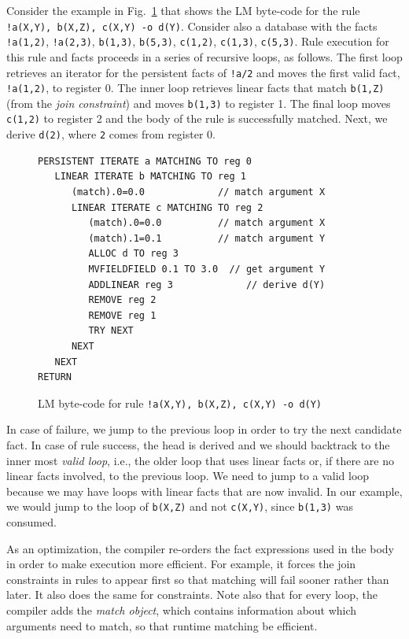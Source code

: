 Consider the example in Fig.~\ref{fig:byte_code} that shows the LM
byte-code for the rule \texttt{!a(X,Y), b(X,Z), c(X,Y) -o
d(Y)}. Consider also a database with the
facts \texttt{!a(1,2)}, \texttt{!a(2,3)}, \texttt{b(1,3)},
\texttt{b(5,3)}, \texttt{c(1,2)}, \texttt{c(1,3)}, \texttt{c(5,3)}. Rule
execution for this rule and facts proceeds in a series of recursive
loops, as follows. The first loop retrieves an iterator for the
persistent facts of \texttt{!a/2} and moves the first valid
fact, \texttt{!a(1,2)}, to register 0. The inner loop retrieves linear
facts that match \texttt{b(1,Z)} (from the
\emph{join constraint}) and moves \texttt{b(1,3)} to register 1. The 
final loop moves \texttt{c(1,2)} to register 2 and the body of the
rule is successfully matched. Next, we derive \texttt{d(2)},
where \texttt{2} comes from register 0.

\begin{figure}[ht]
{\footnotesize
\begin{Verbatim}
PERSISTENT ITERATE a MATCHING TO reg 0
   LINEAR ITERATE b MATCHING TO reg 1
      (match).0=0.0             // match argument X
      LINEAR ITERATE c MATCHING TO reg 2
         (match).0=0.0          // match argument X
         (match).1=0.1          // match argument Y
         ALLOC d TO reg 3
         MVFIELDFIELD 0.1 TO 3.0  // get argument Y
         ADDLINEAR reg 3             // derive d(Y)
         REMOVE reg 2
         REMOVE reg 1
         TRY NEXT
      NEXT
   NEXT
RETURN
\end{Verbatim}
}
\caption{LM byte-code for rule \texttt{!a(X,Y), b(X,Z), c(X,Y) -o d(Y)}}
\label{fig:byte_code}
\end{figure}

In case of failure, we jump to the previous loop in order to try the
next candidate fact. In case of rule success, the head is derived and
we should backtrack to the inner most \emph{valid loop}, i.e., the
older loop that uses linear facts or, if there are no linear facts
involved, to the previous loop. We need to jump to a valid loop
because we may have loops with linear facts that are now invalid. In
our example, we would jump to the loop of \texttt{b(X,Z)} and
not \texttt{c(X,Y)}, since \texttt{b(1,3)} was consumed.

As an optimization, the compiler re-orders the fact expressions used
in the body in order to make execution more efficient. For example, it
forces the join constraints in rules to appear first so that matching
will fail sooner rather than later. It also does the same for
constraints. Note also that for every loop, the compiler adds
the \emph{match object}, which contains information about which
arguments need to match, so that runtime matching be efficient.

